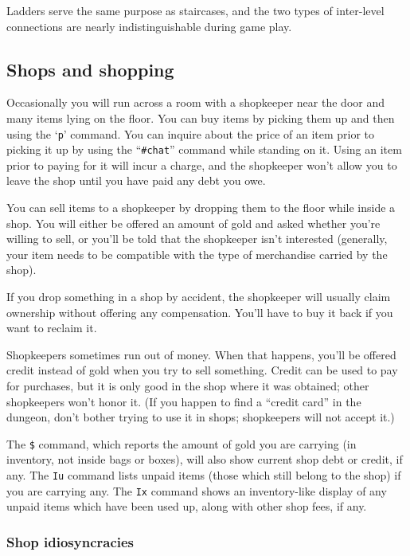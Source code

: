 Ladders serve the same purpose as staircases, and the two types of
inter-level connections are nearly indistinguishable during game play.

\subsection*{Shops and shopping}

Occasionally you will run across a room with a shopkeeper near the door
and many items lying on the floor.  You can buy items by picking them
up and then using the `{\tt p}' command.  You can inquire about the price
of an item prior to picking it up by using the ``{\tt \#chat}'' command
while standing on it.  Using an item prior to paying for it will incur a
charge, and the shopkeeper won't allow you to leave the shop until you
have paid any debt you owe.

You can sell items to a shopkeeper by dropping them to the floor while
inside a shop.  You will either be offered an amount of gold and asked
whether you're willing to sell, or you'll be told that the shopkeeper
isn't interested (generally, your item needs to be compatible with the
type of merchandise carried by the shop).

If you drop something in a shop by accident, the shopkeeper will usually
claim ownership without offering any compensation.  You'll have to buy
it back if you want to reclaim it.

Shopkeepers sometimes run out of money.  When that happens, you'll be
offered credit instead of gold when you try to sell something.  Credit
can be used to pay for purchases, but it is only good in the shop where
it was obtained; other shopkeepers won't honor it.  (If you happen to
find a ``credit card'' in the dungeon, don't bother trying to use it in
shops; shopkeepers will not accept it.)

The {\tt \$} command, which reports the amount of gold you are carrying
(in inventory, not inside bags or boxes), will also show current shop
debt or credit, if any.  The {\tt Iu} command lists unpaid items
(those which still belong to the shop) if you are carrying any.
The {\tt Ix} command shows an inventory-like display of any unpaid
items which have been used up, along with other shop fees, if any.

\subsubsection*{Shop idiosyncracies}

